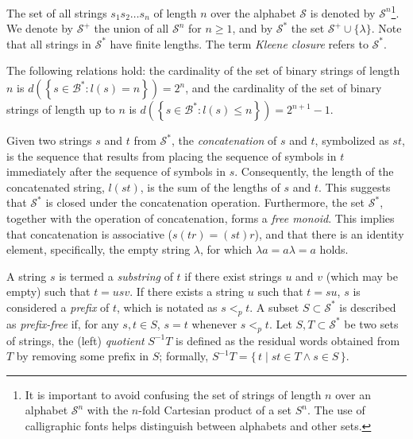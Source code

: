 The set of all strings $s_{1}s_{2}\ldots s_{n}$ of length $n$ over the alphabet $\mathcal{S}$ is denoted by $\mathcal{S}^{n}$\footnote{It is important to avoid confusing the set of strings of length $n$ over an alphabet $\mathcal{S}^n$ with the $n$-fold Cartesian product of a set $S^n$. The use of calligraphic fonts helps distinguish between alphabets and other sets.}. We denote by $\mathcal{S}^{+}$ the union of all $\mathcal{S}^{n}$ for $n\geq1$, and by $\mathcal{S}^{\ast}$ the set $\mathcal{S}^{+} \cup \{\lambda\}$. Note that all strings in $\mathcal{S}^{\ast}$ have finite lengths. The term \emph{Kleene closure} refers to $\mathcal{S}^{\ast}$.

\begin{example}
The following relations hold: the cardinality of the set of binary strings of length $n$ is $d \left( \left\{ s \in \mathcal{B}^{\ast} : l(s) = n \right\} \right) = 2^n$, and the cardinality of the set of binary strings of length up to $n$ is $d \left( \left\{ s \in \mathcal{B}^{\ast} : l(s) \leq n \right\} \right) = 2^{n+1}-1$.
\end{example}

Given two strings $s$ and $t$ from $\mathcal{S}^{\ast}$, the \emph{concatenation} of $s$ and $t$, symbolized as $st$, is the sequence that results from placing the sequence of symbols in $t$ immediately after the sequence of symbols in $s$. Consequently, the length of the concatenated string, $l(st)$, is the sum of the lengths of $s$ and $t$. This suggests that $\mathcal{S}^\ast$ is closed under the concatenation operation. Furthermore, the set $\mathcal{S}^\ast$, together with the operation of concatenation, forms a \emph{free monoid}. This implies that concatenation is associative ($s(tr)=(st)r$), and that there is an identity element, specifically, the empty string $\lambda$, for which $\lambda a = a \lambda = a$ holds.

A string $s$ is termed a \emph{substring} of $t$ if there exist strings $u$ and $v$ (which may be empty) such that $t = usv$. If there exists a string $u$ such that $t = su$, $s$ is considered a \emph{prefix} of $t$, which is notated as $s <_p t$. A subset $S \subset \mathcal{S}^{\ast}$ is described as \emph{prefix-free} if, for any $s, t \in S$, $s = t$ whenever $s <_p t$. Let $S, T \subset \mathcal{S}^{\ast}$ be two sets of strings, the (left) \emph{quotient} $S^{-1}T$ is defined as the residual words obtained from $T$ by removing some prefix in $S$; formally, $S^{-1}T=\{\,t \mid st \in T \land s \in S\,\}$.

